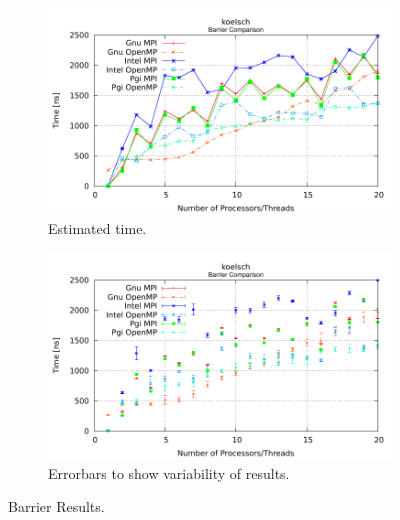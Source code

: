 \begin{figure} [t!]
    \centering
    \captionsetup{justification=centering, singlelinecheck=false}
    \begin{subfigure}{.6\textwidth}
      \centering
      \hspace*{-1.5cm} 
      \includegraphics[width=0.95\linewidth]{Plots/barrier/koelsch.pdf}
      \caption[]{Estimated time.}
      \label{fig:BarrierKoelsch}
    \end{subfigure}%
    \begin{subfigure}{.6\textwidth}
      \centering
      \hspace*{-1.5cm} 
      \includegraphics[width=0.95\linewidth]{Plots/barrier/koelschError.pdf}
      \caption{Errorbars to show variability of results.}
      \label{fig:BarrierErrorBarsKoelsch}
    \end{subfigure}
\caption{Barrier Results.}
\label{fig:BarrierAndErrorBarsForKoelsch}
\end{figure}


